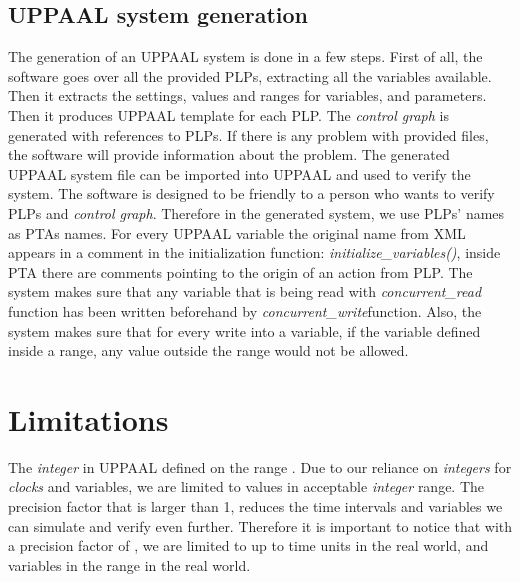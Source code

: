 \subsection{UPPAAL system generation}
The generation of an UPPAAL system is done in a few steps. First of all, the software goes over all the provided PLPs, extracting all the variables available. Then it extracts the settings, values and ranges for variables, and parameters. Then it produces UPPAAL template for each PLP. The \textit{control graph} is generated with references to PLPs. If there is any problem with provided files, the software will provide information about the problem. The generated UPPAAL system file can be imported into UPPAAL and used to verify the system. The software is designed to be friendly to a person who wants to verify PLPs and \textit{control graph}. Therefore in the generated system, we use PLPs’ names as PTAs names. For every UPPAAL variable the original name from XML appears in a comment in the initialization function: \textcolor{ColorUppaalFunction}{\textit{initialize_variables()}}​, inside PTA there are comments pointing to the origin of an action from PLP. The system makes sure that any variable that is being read with \textcolor{ColorUppaalFunction}{\textit{concurrent_read}} function has been written beforehand by \textcolor{ColorUppaalFunction}{\textit{concurrent_write}}​ function. Also, the system makes sure that for every write into a variable, if the variable defined inside a range, any value outside the range would not be allowed.\\
\section{Limitations}
The \textit{integer} in UPPAAL defined on the range \tmy{\left [ -32768, 32767 \right ]}{[-32768, 32767]}. Due to our reliance on \textit{integers} for \textit{clocks} and variables, we are limited to values in acceptable \textit{integer} range. The precision factor that is larger than 1, reduces the time intervals and variables we can simulate and verify even further. Therefore it is important to notice that with a precision factor of , we are limited to up to  time units in the real world, and variables in the range in the real world. \\
